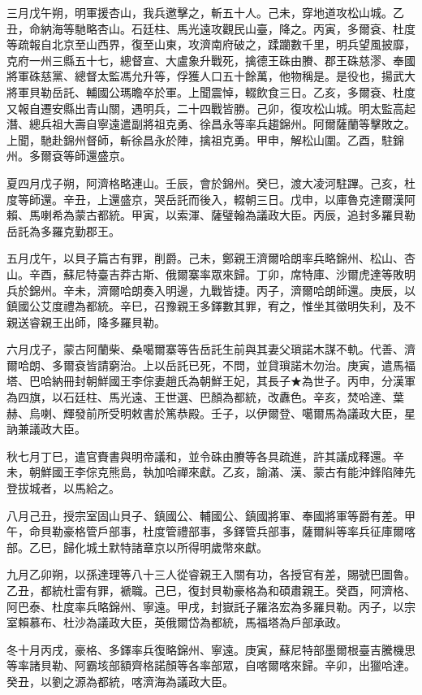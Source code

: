 \begin{pinyinscope}
三月戊午朔，明軍援杏山，我兵邀擊之，斬五十人。己未，穿地道攻松山城。乙丑，命納海等馳略杏山。石廷柱、馬光遠攻觀民山臺，降之。丙寅，多爾袞、杜度等疏報自北京至山西界，復至山東，攻濟南府破之，蹂躪數千里，明兵望風披靡，克府一州三縣五十七，總督宣、大盧象升戰死，擒德王硃由賸、郡王硃慈漻、奉國將軍硃慈黨、總督太監馮允升等，俘獲人口五十餘萬，他物稱是。是役也，揚武大將軍貝勒岳託、輔國公瑪瞻卒於軍。上聞震悼，輟飲食三日。乙亥，多爾袞、杜度又報自遷安縣出青山關，遇明兵，二十四戰皆勝。己卯，復攻松山城。明太監高起潛、總兵祖大壽自寧遠遣副將祖克勇、徐昌永等率兵趨錦州。阿爾薩蘭等擊敗之。上聞，馳赴錦州督師，斬徐昌永於陣，擒祖克勇。甲申，解松山圍。乙酉，駐錦州。多爾袞等師還盛京。

夏四月戊子朔，阿濟格略連山。壬辰，會於錦州。癸巳，渡大凌河駐蹕。己亥，杜度等師還。辛丑，上還盛京，哭岳託而後入，輟朝三日。戊申，以庫魯克達爾漢阿賴、馬喇希為蒙古都統。甲寅，以索渾、薩璧翰為議政大臣。丙辰，追封多羅貝勒岳託為多羅克勤郡王。

五月戊午，以貝子篇古有罪，削爵。己未，鄭親王濟爾哈朗率兵略錦州、松山、杏山。辛酉，蘇尼特臺吉莽古斯、俄爾寨率眾來歸。丁卯，席特庫、沙爾虎達等敗明兵於錦州。辛未，濟爾哈朗奏入明邊，九戰皆捷。丙子，濟爾哈朗師還。庚辰，以鎮國公艾度禮為都統。辛巳，召豫親王多鐸數其罪，宥之，惟坐其徵明失利，及不親送睿親王出師，降多羅貝勒。

六月戊子，蒙古阿蘭柴、桑噶爾寨等告岳託生前與其妻父瑣諾木謀不軌。代善、濟爾哈朗、多爾袞皆請窮治。上以岳託已死，不問，並貸瑣諾木勿治。庚寅，遣馬福塔、巴哈納冊封朝鮮國王李倧妻趙氏為朝鮮王妃，其長子★為世子。丙申，分漢軍為四旗，以石廷柱、馬光遠、王世選、巴顏為都統，改纛色。辛亥，焚哈達、葉赫、烏喇、輝發前所受明敕書於篤恭殿。壬子，以伊爾登、噶爾馬為議政大臣，星訥兼議政大臣。

秋七月丁巳，遣官賚書與明帝議和，並令硃由賸等各具疏進，許其議成釋還。辛未，朝鮮國王李倧克熊島，執加哈禪來獻。乙亥，諭滿、漢、蒙古有能沖鋒陷陣先登拔城者，以馬給之。

八月己丑，授宗室固山貝子、鎮國公、輔國公、鎮國將軍、奉國將軍等爵有差。甲午，命貝勒豪格管戶部事，杜度管禮部事，多鐸管兵部事，薩爾糾等率兵征庫爾喀部。乙巳，歸化城土默特諸章京以所得明歲幣來獻。

九月乙卯朔，以孫達理等八十三人從睿親王入關有功，各授官有差，賜號巴圖魯。乙丑，都統杜雷有罪，褫職。己巳，復封貝勒豪格為和碩肅親王。癸酉，阿濟格、阿巴泰、杜度率兵略錦州、寧遠。甲戌，封嶽託子羅洛宏為多羅貝勒。丙子，以宗室賴慕布、杜沙為議政大臣，英俄爾岱為都統，馬福塔為戶部承政。

冬十月丙戌，豪格、多鐸率兵復略錦州、寧遠。庚寅，蘇尼特部墨爾根臺吉騰機思等率諸貝勒、阿霸垓部額齊格諾顏等各率部眾，自喀爾喀來歸。辛卯，出獵哈達。癸丑，以劉之源為都統，喀濟海為議政大臣。


\end{pinyinscope}
